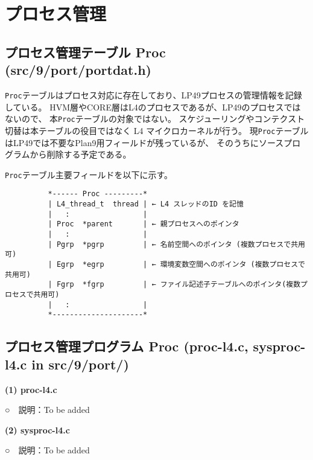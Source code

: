 {%
\chapter{プロセス管理}

\section{プロセス管理テーブル Proc (src/9/port/portdat.h)}
      {\tt Proc}テーブルはプロセス対応に存在しており、LP49プロセスの管理情報を記録している。
HVM層やCORE層はL4のプロセスであるが、LP49のプロセスではないので、
本{\tt Proc}テーブルの対象ではない。
スケジューリングやコンテクスト切替は本テーブルの役目ではなく L4 マイクロカーネルが行う。
現{\tt Proc}テーブルはLP49では不要なPlan9用フィールドが残っているが、
そのうちにソースプログラムから削除する予定である。

      {\tt Proc}テーブル主要フィールドを以下に示す。

{\small
\begin{verbatim}
          *------ Proc ---------*                                        
          | L4_thread_t  thread | ← L4 スレッドのID を記憶      
          |   :                 |                                 
          | Proc  *parent       | ← 親プロセスへのポインタ
          |   :                 |                               
          | Pgrp  *pgrp         | ← 名前空間へのポインタ (複数プロセスで共用可)
          | Egrp  *egrp         | ← 環境変数空間へのポインタ (複数プロセスで共用可)
          | Fgrp  *fgrp         | ← ファイル記述子テーブルへのポインタ(複数プロセスで共用可)
          |   :                 |                                  
          *---------------------*                                            
\end{verbatim}
}

\section{プロセス管理プログラム Proc (proc-l4.c, sysproc-l4.c in src/9/port/)}

{\bf\flushleft (1) proc-l4.c}

○　説明：To be added

\vspace{4cm}



{\bf\flushleft (2) sysproc-l4.c}

○　説明：To be added

\vspace{4cm}



}
